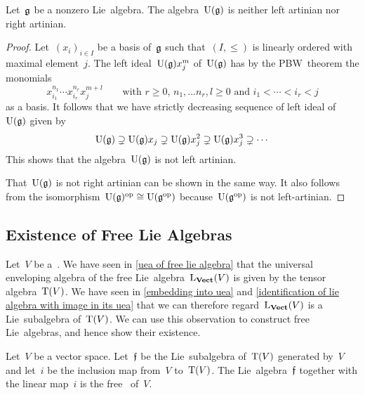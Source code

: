 \begin{proposition}
	Let~$\mathfrak{g}$ be a nonzero Lie~algebra.
	The algebra~$\operatorname{U}(\mathfrak{g})$ is neither left artinian nor right artinian.
\end{proposition}


\begin{proof}
	Let~$(x_i)_{i \in I}$ be a basis of~$\mathfrak{g}$ such that~$(I, \leq)$ is linearly ordered with maximal element~$j$.
	The left ideal~$\operatorname{U}(\mathfrak{g}) x_j^m$ of~$\operatorname{U}(\mathfrak{g})$ has by the PBW~theorem the monomials
	\[
		x_{i_1}^{n_1} \dotsm x_{i_r}^{n_r} x_j^{m+l}
		\qquad
		\text{with~$r \geq 0$,~$n_1, \dotsc n_r, l \geq 0$ and~$i_1 < \dotsb < i_r < j$}
	\]
	as a basis.
	It follows that we have strictly decreasing sequence of left ideal of~$\operatorname{U}(\mathfrak{g})$ given by
	\[
		\operatorname{U}(\mathfrak{g})
		\supsetneq
		\operatorname{U}(\mathfrak{g}) x_j
		\supsetneq
		\operatorname{U}(\mathfrak{g}) x_j^2
		\supsetneq
		\operatorname{U}(\mathfrak{g}) x_j^3
		\supsetneq
		\dotsb
	\]
	This shows that the algebra~$\operatorname{U}(\mathfrak{g})$ is not left artinian.

	That~$\operatorname{U}(\mathfrak{g})$ is not right artinian can be shown in the same way.
	It also follows from the isomorphism~$\operatorname{U}(\mathfrak{g})^{\mathrm{op}} \cong \operatorname{U}(\mathfrak{g}^{\mathrm{op}})$ because~$\operatorname{U}(\mathfrak{g}^{\mathrm{op}})$ is not left-artinian.
\end{proof}



\subsection{Existence of Free Lie Algebras}

\begin{fluff}
	Let~$V$ be a~\vectorspace{$\kf$}.
	We have seen in \cref{uea of free lie algebra} that the universal enveloping algebra of the free Lie~algebra~$\operatorname{L}_{\mathbf{Vect}}(V)$ is given by the tensor algebra~$\operatorname{T}(V)$.
	We have seen in \cref{embedding into uea} and \cref{identification of lie algebra with image in its uea} that we can therefore regard~$\operatorname{L}_{\mathbf{Vect}}(V)$ is a Lie~subalgebra of~$\operatorname{T}(V)$.
	We can use this observation to construct free Lie~algebras, and hence show their existence.
\end{fluff}


\begin{proposition}
	\label{construction of free lie algebras}
	Let~$V$ be a vector space.
	Let~$\mathfrak{f}$ be the Lie~subalgebra of~$\operatorname{T}(V)$ generated by~$V$ and let~$i$ be the inclusion map from~$V$ to~$\operatorname{T}(V)$.
	The Lie~algebra~$\mathfrak{f}$ together with the linear map~$i$ is the free~\liealgebra{$\kf$} of~$V$.
\end{proposition}


